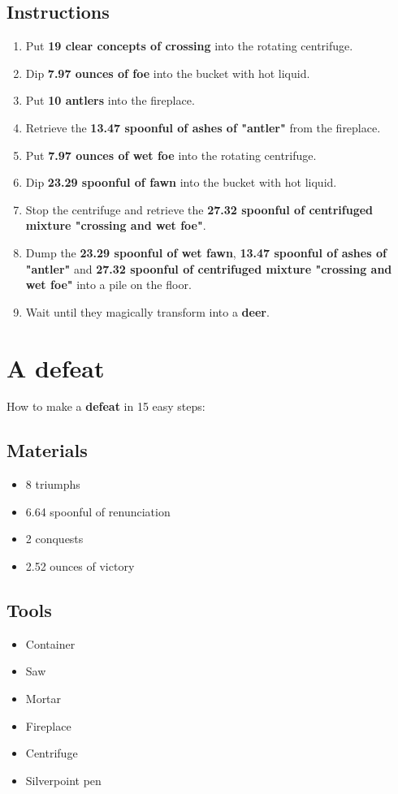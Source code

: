\documentclass{article}
\begin{document}
\subsection{Instructions}\begin{enumerate}
\item 
Put \textbf{19 clear concepts of crossing} into the rotating centrifuge.
\item 
Dip \textbf{7.97 ounces of foe} into the bucket with hot liquid.
\item 
Put \textbf{10 antlers} into the fireplace.
\item 
Retrieve the \textbf{13.47 spoonful of ashes of "antler"} from the fireplace.
\item 
Put \textbf{7.97 ounces of wet foe} into the rotating centrifuge.
\item 
Dip \textbf{23.29 spoonful of fawn} into the bucket with hot liquid.
\item 
Stop the centrifuge and retrieve the \textbf{27.32 spoonful of centrifuged mixture "crossing and wet foe"}.
\item 
Dump the \textbf{23.29 spoonful of wet fawn}, \textbf{13.47 spoonful of ashes of "antler"} and \textbf{27.32 spoonful of centrifuged mixture "crossing and wet foe"} into a pile on the floor.
\item 
Wait until they magically transform into a \textbf{deer}.
\end{enumerate}
\newpage
\section{A defeat}How to make a \textbf{defeat} in 15 easy steps:

\subsection{Materials}\begin{itemize}
\item 
8 triumphs
\item 
6.64 spoonful of renunciation
\item 
2 conquests
\item 
2.52 ounces of victory
\end{itemize}
\subsection{Tools}\begin{itemize}
\item 
Container
\item 
Saw
\item 
Mortar
\item 
Fireplace
\item 
Centrifuge
\item 
Silverpoint pen
\end{itemize}
\end{document}
